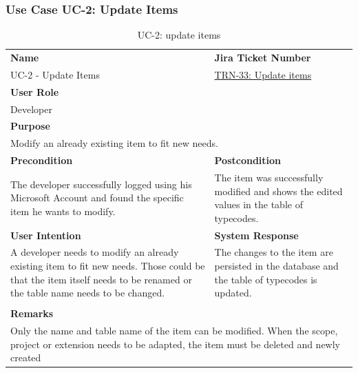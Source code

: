 \subsubsection{Use Case UC-2: Update Items}\label{subsubsec:use-case-uc-2:-update-items}

\begin{table}[H]
    \centering
    \begin{tabular}{|p{}|p{}|}

        \hline
        \rowcolor{gray!50}\textbf{Name} & \rowcolor{gray!50}\textbf{Jira Ticket Number} \\
        UC-2 - Update Items
        &
        \href{https://fh-burgenland.atlassian.net/browse/TRN-33}{TRN-33: Update items} \\ \hline

        \multicolumn{2}{|l|}{\rowcolor{gray!50}\textbf{User Role}} \\
        \multicolumn{2}{|l|}{Developer} \\ \hline

        \multicolumn{2}{|l|}{\rowcolor{gray!50}\textbf{Purpose}} \\
        \multicolumn{2}{|l|}{Modify an already existing item to fit new needs.} \\ \hline

        \rowcolor{gray!50}\textbf{Precondition} & \rowcolor{gray!50}\textbf{Postcondition} \\
        The developer successfully logged using his Microsoft Account and found the specific item he wants to modify.
        &
        The item was successfully modified and shows the edited values in the table of typecodes. \\ \hline

        \rowcolor{gray!50}\textbf{User Intention} & \rowcolor{gray!50}\textbf{System Response} \\
        A developer needs to modify an already existing item to fit new needs.
        Those could be that the item itself needs to be renamed or the table name needs to be changed.
        &
        The changes to the item are persisted in the database and the table of typecodes is updated. \\ \hline

        & \\ \hline

        \multicolumn{2}{|l|}{\rowcolor{gray!50}\textbf{Remarks}} \\
        \multicolumn{2}{|p{1\textwidth}|}{Only the name and table name of the item can be modified. When the scope, project or extension needs to be adapted, the item must be deleted and newly created } \\ \hline
    \end{tabular}
    \caption{UC-2: update items}
    \label{tab:uc-2_update items}
\end{table}

